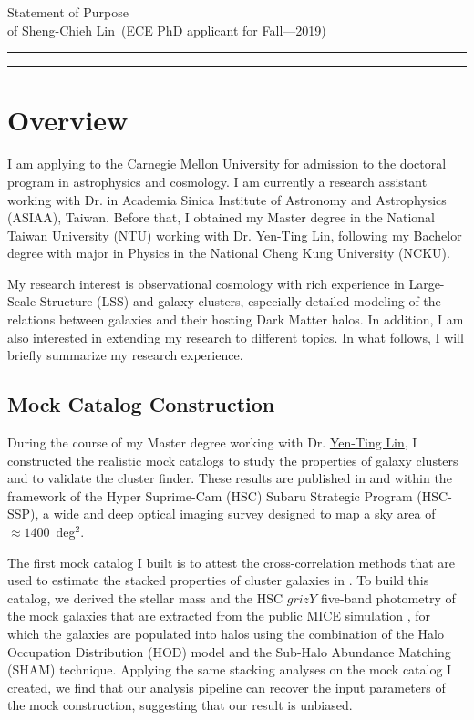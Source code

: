 \documentclass{article}
\newcommand{\soptitle}{Statement of Purpose}
\newcommand{\yourname}{Sheng-Chieh Lin}
\newcommand{\hhref}[3][blue]{\href{#2}{\color{#1}{#3}}}%
\begin{document}
\begin{center}\LARGE\soptitle\\
\large of \yourname\ (ECE PhD applicant for Fall---2019)
\end{center}

\hrule
\vspace{1pt}
\hrule height 1pt

\bigskip

\section*{Overview}

I am applying to the Carnegie Mellon University for admission to the doctoral program in astrophysics and cosmology.
I am currently a research assistant working with Dr. \hhref{http://idv.sinica.edu.tw/teppei/}{Teppei Okumura} in Academia Sinica Institute of Astronomy and Astrophysics (ASIAA), Taiwan.
Before that, I obtained my Master degree in the National Taiwan University (NTU) working with Dr. \href{http://idv.sinica.edu.tw/yentinglin/}{Yen-Ting Lin}, following my Bachelor degree with major in Physics in the National Cheng Kung University (NCKU).


My research interest is observational cosmology with rich experience in Large-Scale Structure (LSS) and galaxy clusters, especially detailed modeling of the relations between galaxies and their hosting Dark Matter halos.
In addition, I am also interested in extending my research to different topics.
In what follows, I will briefly summarize my research experience.


\subsection*{Mock Catalog Construction}

During the course of my Master degree working with Dr. \href{http://idv.sinica.edu.tw/yentinglin/}{Yen-Ting Lin}, I constructed the realistic mock catalogs to study the properties of galaxy clusters and to validate the cluster finder.
These results are published in \citet{2017ApJ...851..139L} and \citet{2018PASJ...70S..20O} within the framework of the Hyper Suprime-Cam (HSC) Subaru Strategic Program (HSC-SSP), a wide and deep optical imaging survey designed to map a sky area of $\approx1400$~deg$^2$.


The first mock catalog I built is to attest the cross-correlation methods that are used to estimate the stacked properties of cluster galaxies in \citet{2017ApJ...851..139L}.
To build this catalog, we derived the stellar mass and the HSC $grizY$ five-band photometry of the mock galaxies that are extracted from the public MICE simulation \citep{2015MNRAS.453.1513C}, for which the galaxies are populated into halos using the combination of the Halo Occupation Distribution (HOD) model and the Sub-Halo Abundance Matching (SHAM) technique.
Applying the same stacking analyses on the mock catalog I created, we find that our analysis pipeline can recover the input parameters of the mock construction, suggesting that our result is unbiased.
\end{document}
